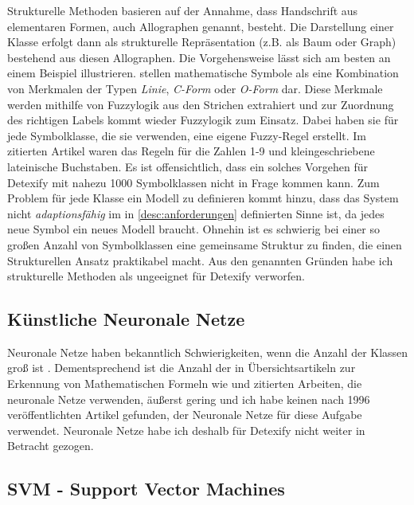 Strukturelle Methoden basieren auf der Annahme, dass Handschrift aus elementaren Formen, auch Allographen genannt, besteht. Die Darstellung einer Klasse erfolgt dann als strukturelle Repräsentation (z.B. als Baum oder Graph) bestehend aus diesen Allographen. Die Vorgehensweise lässt sich am besten an einem Beispiel illustrieren. \citet{Fitzgerald:2004p10858} stellen mathematische Symbole als eine Kombination von Merkmalen der Typen \emph{Linie}, \emph{C-Form} oder \emph{O-Form} dar. Diese Merkmale werden mithilfe von Fuzzylogik aus den Strichen extrahiert und zur Zuordnung des richtigen Labels kommt wieder Fuzzylogik zum Einsatz. Dabei haben sie für jede Symbolklasse, die sie verwenden, eine eigene Fuzzy-Regel erstellt. Im zitierten Artikel waren das Regeln für die Zahlen 1-9 und kleingeschriebene lateinische Buchstaben. Es ist offensichtlich, dass ein solches Vorgehen für Detexify mit nahezu 1000 Symbolklassen nicht in Frage kommen kann. Zum Problem für jede Klasse ein Modell zu definieren kommt hinzu, dass das System nicht \emph{adaptionsfähig} im in \ref{desc:anforderungen} definierten Sinne ist, da jedes neue Symbol ein neues Modell braucht. Ohnehin ist es schwierig bei einer so großen Anzahl von Symbolklassen eine gemeinsame Struktur zu finden, die einen Strukturellen Ansatz praktikabel macht. Aus den genannten Gründen habe ich strukturelle Methoden als ungeeignet für Detexify verworfen.

\subsection{Künstliche Neuronale Netze} \label{sub:kuenstliche_neuronale_netze}

Neuronale Netze haben bekanntlich Schwierigkeiten, wenn die Anzahl der Klassen groß ist \cite{Jaeger:2003p1097}. Dementsprechend ist die Anzahl der in Übersichtsartikeln zur Erkennung von Mathematischen Formeln wie \cite{Chan:2000p559} und \cite{Tapia:2007p9160} zitierten Arbeiten, die neuronale Netze verwenden, äußerst gering und ich habe keinen nach 1996 veröffentlichten Artikel gefunden, der Neuronale Netze für diese Aufgabe verwendet. Neuronale Netze habe ich deshalb für Detexify nicht weiter in Betracht gezogen.

\subsection[SVM]{SVM - Support Vector Machines} \label{sub:svm}

